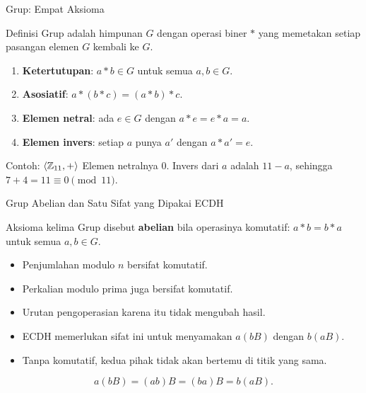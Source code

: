 \documentclass[aspectratio=169,11pt]{beamer}
\begin{document}
\begin{frame}{Grup: Empat Aksioma}
    \begin{block}{Definisi}
        \footnotesize
        Grup adalah himpunan $G$ dengan operasi biner $*$ yang memetakan
        setiap pasangan elemen $G$ kembali ke $G$.
    \end{block}
    \vspace{0.05cm}
    \begin{enumerate}
        \item \textbf{Ketertutupan}: $a * b \in G$ untuk semua $a,b \in G$.
        \item \textbf{Asosiatif}: $a * (b * c) = (a * b) * c$.
        \item \textbf{Elemen netral}: ada $e \in G$ dengan
              $a * e = e * a = a$.
        \item \textbf{Elemen invers}: setiap $a$ punya $a'$ dengan
              $a * a' = e$.
    \end{enumerate}
    \vspace{0.05cm}
    \begin{exampleblock}{Contoh: $\langle \mathbb{Z}_{11}, + \rangle$}
        \footnotesize
        Elemen netralnya $0$. Invers dari $a$ adalah $11-a$, sehingga
        $7 + 4 = 11 \equiv 0 \pmod{11}$.
    \end{exampleblock}
\end{frame}

\begin{frame}{Grup Abelian dan Satu Sifat yang Dipakai ECDH}
    \begin{block}{Aksioma kelima}
        \footnotesize
        Grup disebut \textbf{abelian} bila operasinya komutatif:
        $a * b = b * a$ untuk semua $a,b \in G$.
    \end{block}
    \vspace{0.1cm}
    \begin{itemize}
        \item Penjumlahan modulo $n$ bersifat komutatif.
        \item Perkalian modulo prima juga bersifat komutatif.
        \item Urutan pengoperasian karena itu tidak mengubah hasil.
        \item ECDH memerlukan sifat ini untuk menyamakan
              $a(bB)$ dengan $b(aB)$.
        \item Tanpa komutatif, kedua pihak tidak akan bertemu di titik yang
              sama.
    \end{itemize}
    \[
        a(bB) = (ab)B = (ba)B = b(aB) .
    \]
\end{frame}
\end{document}
